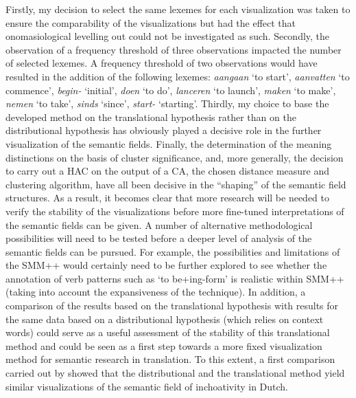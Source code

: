 Firstly, my decision to select the same lexemes for each visualization was taken to ensure the comparability of the visualizations but had the effect that onomasiological levelling out could not be investigated as such. Secondly, the observation of a frequency threshold of three observations impacted the number of selected lexemes. A frequency threshold of two observations would have resulted in the addition of the following lexemes: \textit{aangaan} `to start', \textit{aanvatten} `to commence', \textit{begin-} `initial', \textit{doen} `to do', \textit{lanceren} `to launch', \textit{maken} `to make', \textit{nemen} `to take', \textit{sinds} `since', \textit{start-} `starting'. Thirdly, my choice to base the developed method on the translational hypothesis rather than on the distributional hypothesis has obviously played a decisive role in the further visualization of the semantic fields. Finally, the determination of the meaning distinctions on the basis of cluster significance, and, more generally, the decision to carry out a HAC on the output of a CA, the chosen distance measure and clustering algorithm, have all been decisive in the ``shaping'' of the semantic field structures. As a result, it becomes clear that more research will be needed to verify the stability of the visualizations before more fine-tuned interpretations of the semantic fields can be given. A number of alternative methodological possibilities will need to be tested before a deeper level of analysis of the semantic fields can be pursued. For example, the possibilities and limitations of the SMM++ would certainly need to be further explored to see whether the annotation of verb patterns such as ‘to be+ing-form’ is realistic within SMM++ (taking into account the expansiveness of the technique). In addition, a comparison of the results based on the translational hypothesis with results for the same data based on a distributional hypothesis (which relies on context words) could serve as a useful assessment of the stability of this translational method and could be seen as a first step towards a more fixed visualization method for semantic research in translation. To this extent, a first comparison carried out by \citet{vandevoorde_distributional_2016} showed that the distributional and the translational method yield similar visualizations of the semantic field of inchoativity in Dutch.

